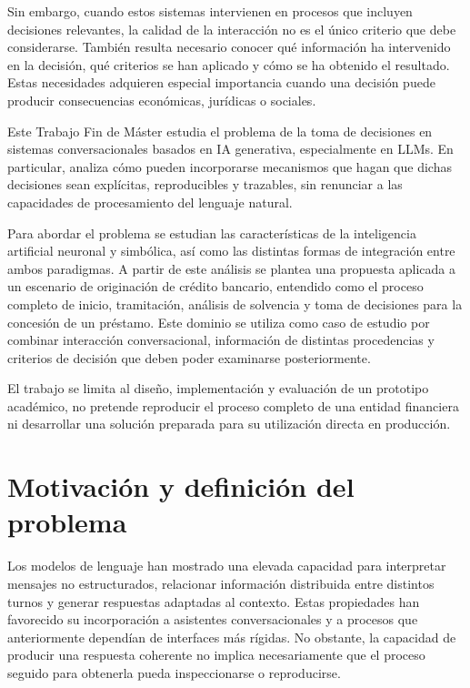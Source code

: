 \documentclass[12pt,a4paper]{report}
\begin{document}
Sin embargo, cuando estos sistemas intervienen en procesos que incluyen decisiones relevantes, la calidad de la interacción no es el único criterio que debe considerarse. También resulta necesario conocer qué información ha intervenido en la decisión, qué criterios se han aplicado y cómo se ha obtenido el resultado. Estas necesidades adquieren especial importancia cuando una decisión puede producir consecuencias económicas, jurídicas o sociales.

Este Trabajo Fin de Máster estudia el problema de la toma de decisiones en sistemas conversacionales basados en IA generativa, especialmente en LLMs. En particular, analiza cómo pueden incorporarse mecanismos que hagan que dichas decisiones sean explícitas, reproducibles y trazables, sin renunciar a las capacidades de procesamiento del lenguaje natural.

Para abordar el problema se estudian las características de la inteligencia artificial neuronal y simbólica, así como las distintas formas de integración entre ambos paradigmas. A partir de este análisis se plantea una propuesta aplicada a un escenario de originación de crédito bancario, entendido como el proceso completo de inicio, tramitación, análisis de solvencia y toma de decisiones para la concesión de un préstamo. Este dominio se utiliza como caso de estudio por combinar interacción conversacional, información de distintas procedencias y criterios de decisión que deben poder examinarse posteriormente.

El trabajo se limita al diseño, implementación y evaluación de un prototipo académico, no pretende reproducir el proceso completo de una entidad financiera ni desarrollar una solución preparada para su utilización directa en producción.

\section{Motivación y definición del problema}

Los modelos de lenguaje han mostrado una elevada capacidad para interpretar mensajes no estructurados, relacionar información distribuida entre distintos turnos y generar respuestas adaptadas al contexto. Estas propiedades han favorecido su incorporación a asistentes conversacionales y a procesos que anteriormente dependían de interfaces más rígidas. No obstante, la capacidad de producir una respuesta coherente no implica necesariamente que el proceso seguido para obtenerla pueda inspeccionarse o reproducirse.
\end{document}
